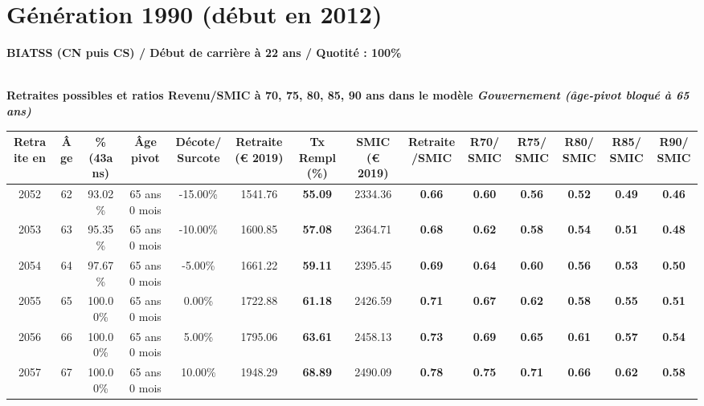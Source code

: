 \newpage 
 
\section{Génération 1990 (début en 2012)\label{BIATSS_100_22_1990_0}} 
 
{\bf \noindent BIATSS (CN puis CS) / Début de carrière à 22 ans / Quotité : 100\%}  ~ 

 ~\\{\bf \noindent Retraites possibles et ratios Revenu/SMIC à 70, 75, 80, 85, 90 ans dans le modèle \emph{Gouvernement (âge-pivot bloqué à 65 ans)}}  
 
\begin{adjustbox}{max width=\textwidth} 
\begin{tabular}[htb]{|c|c||c|c|c||c|c||c|c||c|c|c|c|c|} 
\hline 
 Retraite en &  Âge &  \%(43ans) &  Âge pivot &  Décote/Surcote &  Retraite (\euro{} 2019) &  Tx Rempl(\%) &  SMIC (\euro{} 2019) &  Retraite/SMIC &  R70/SMIC &  R75/SMIC &  R80/SMIC &  R85/SMIC &  R90/SMIC \\ 
\hline \hline 
 2052 &  62 &  93.02\% &  65 ans 0 mois &  -15.00\% &  1541.76 &  {\bf 55.09} &  2334.36 &  {\bf {\color{red} 0.66}} &  {\bf {\color{red} 0.60}} &  {\bf {\color{red} 0.56}} &  {\bf {\color{red} 0.52}} &  {\bf {\color{red} 0.49}} &  {\bf {\color{red} 0.46}} \\ 
\hline 
 2053 &  63 &  95.35\% &  65 ans 0 mois &  -10.00\% &  1600.85 &  {\bf 57.08} &  2364.71 &  {\bf {\color{red} 0.68}} &  {\bf {\color{red} 0.62}} &  {\bf {\color{red} 0.58}} &  {\bf {\color{red} 0.54}} &  {\bf {\color{red} 0.51}} &  {\bf {\color{red} 0.48}} \\ 
\hline 
 2054 &  64 &  97.67\% &  65 ans 0 mois &  -5.00\% &  1661.22 &  {\bf 59.11} &  2395.45 &  {\bf {\color{red} 0.69}} &  {\bf {\color{red} 0.64}} &  {\bf {\color{red} 0.60}} &  {\bf {\color{red} 0.56}} &  {\bf {\color{red} 0.53}} &  {\bf {\color{red} 0.50}} \\ 
\hline 
 2055 &  65 &  100.00\% &  65 ans 0 mois &  0.00\% &  1722.88 &  {\bf 61.18} &  2426.59 &  {\bf {\color{red} 0.71}} &  {\bf {\color{red} 0.67}} &  {\bf {\color{red} 0.62}} &  {\bf {\color{red} 0.58}} &  {\bf {\color{red} 0.55}} &  {\bf {\color{red} 0.51}} \\ 
\hline 
 2056 &  66 &  100.00\% &  65 ans 0 mois &  5.00\% &  1795.06 &  {\bf 63.61} &  2458.13 &  {\bf {\color{red} 0.73}} &  {\bf {\color{red} 0.69}} &  {\bf {\color{red} 0.65}} &  {\bf {\color{red} 0.61}} &  {\bf {\color{red} 0.57}} &  {\bf {\color{red} 0.54}} \\ 
\hline 
 2057 &  67 &  100.00\% &  65 ans 0 mois &  10.00\% &  1948.29 &  {\bf 68.89} &  2490.09 &  {\bf {\color{red} 0.78}} &  {\bf {\color{red} 0.75}} &  {\bf {\color{red} 0.71}} &  {\bf {\color{red} 0.66}} &  {\bf {\color{red} 0.62}} &  {\bf {\color{red} 0.58}} \\ 
\hline 
\hline 
\end{tabular} 
\end{adjustbox} 
 
